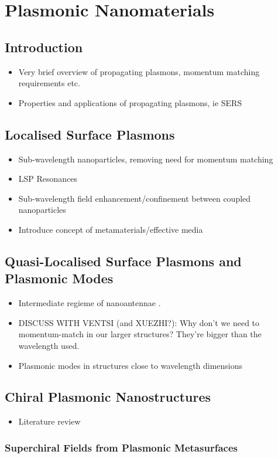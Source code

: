 \chapter{Plasmonic Nanomaterials}\label{sec:background:Plasmonics}

\section{Introduction}
\begin{itemize}
    \item Very brief overview of propagating plasmons, momentum matching requirements etc.
    \item Properties and applications of propagating plasmons, ie SERS
\end{itemize}

\section{Localised Surface Plasmons}\label{sec:background:Plasmonics:Metamaterials}
\begin{itemize}
    \item Sub-wavelength nanoparticles, removing need for momentum matching
    \item LSP Resonances
    \item Sub-wavelength field enhancement/confinement between coupled nanoparticles
    \item Introduce concept of metamaterials/effective media
\end{itemize}

\section{Quasi-Localised Surface Plasmons and Plasmonic Modes}
\begin{itemize}
    \item Intermediate regieme of nanoantennae \cite{Zheng2013, Zheng2015}.
    \item DISCUSS WITH VENTSI (and XUEZHI?): Why don't we need to momentum-match in our larger structures? They're bigger than the wavelength used.
    \item Plasmonic modes in structures close to wavelength dimensions
\end{itemize}

\section{Chiral Plasmonic Nanostructures}
\begin{itemize}
    \item Literature review
\end{itemize}

\subsection{Superchiral Fields from Plasmonic Metasurfaces}